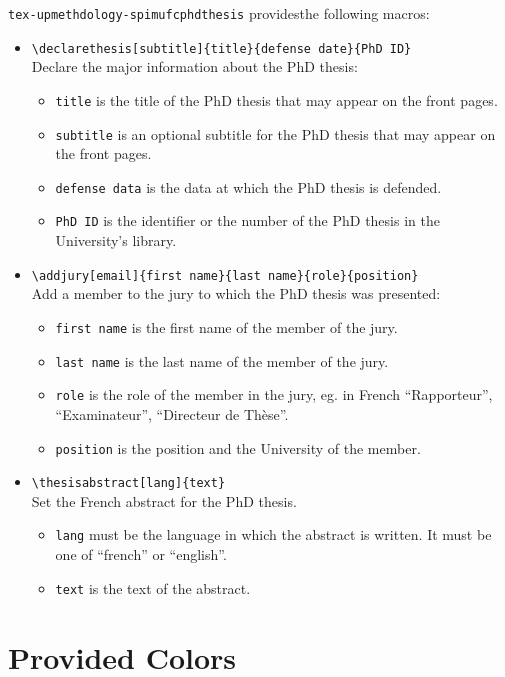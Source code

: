 \documentclass[article,english]{upmethodology-document}
\begin{document}
\texttt{tex-upmethdology-spimufcphdthesis} providesthe following macros:
\begin{itemize}
\item \texttt{{\textbackslash}declarethesis[subtitle]\{title\}\{defense date\}\{PhD ID\}} \\
	Declare the major information about the PhD thesis:
	\begin{itemize}
	\item \texttt{title} is the title of the PhD thesis that may appear on the front pages.
	\item \texttt{subtitle} is an optional subtitle for the PhD thesis that may appear on the front pages.
	\item \texttt{defense data} is the data at which the PhD thesis is defended.
	\item \texttt{PhD ID} is the identifier or the number of the PhD thesis in the University's library.
	\end{itemize}
\item \texttt{{\textbackslash}addjury[email]\{first name\}\{last name\}\{role\}\{position\}} \\
	Add a member to the jury to which the PhD thesis was presented:
	\begin{itemize}
	\item \texttt{first name} is the first name of the member of the jury.
	\item \texttt{last name} is the last name of the member of the jury.
	\item \texttt{role} is the role of the member in the jury, eg. in French ``Rapporteur'', ``Examinateur'', ``Directeur de Th\`ese''.
	\item \texttt{position} is the position and the University of the member.
	\end{itemize}
\item \texttt{{\textbackslash}thesisabstract[lang]\{text\}} \\
	Set the French abstract for the PhD thesis.
	\begin{itemize}
	\item \texttt{lang} must be the language in which the abstract is written. It must be one of ``french'' or ``english''.
	\item \texttt{text} is the text of the abstract.
	\end{itemize}
\end{itemize}

\section{Provided Colors}
\end{document}
